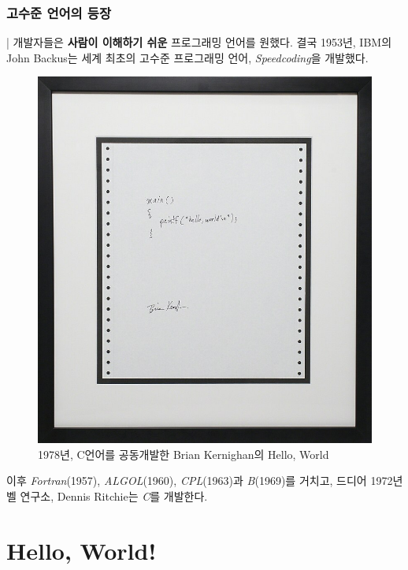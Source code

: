 \documentclass[a4paper,12pt]{book}
\begin{document}
\subsubsection{고수준 언어의 등장}

| 개발자들은 \textbf{사람이 이해하기 쉬운} 프로그래밍 언어를 원했다.
결국 1953년, IBM의 John Backus는 세계 최초의 고수준 프로그래밍 언어,
\textit{Speedcoding}을 개발했다.

\begin{figure}[!h]
    \centering
    \includegraphics[width=\linewidth]{images/hello-world.jpg}
    \caption{1978년, C언어를 공동개발한 Brian Kernighan의 Hello, World}
\end{figure}

이후 \textit{Fortran}(1957), \textit{ALGOL}(1960), \textit{CPL}(1963)과
\textit{B}(1969)를 거치고, 드디어 1972년 벨 연구소, Dennis Ritchie는
\textit{C}를 개발한다.

\pagebreak


\section{Hello, World!}
\end{document}
